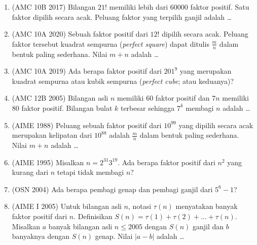 \documentclass[12pt]{scrartcl}
\begin{document}
\begin{enumerate}
	\item (AMC 10B 2017)
	Bilangan $21!$ memiliki lebih dari $60000$ faktor positif.
	Satu faktor dipilih secara acak.
	Peluang faktor yang terpilih ganjil adalah \dots

	\item (AMC 10A 2020)
	Sebuah faktor positif dari $12!$ dipilih secara acak.
	Peluang faktor tersebut kuadrat sempurna (\textit{perfect square}) dapat ditulis $\frac{m}{n}$
	dalam bentuk paling sederhana. Nilai $m + n$ adalah \dots

	\item (AMC 10A 2019)
	Ada berapa faktor positif dari $201^{9}$ yang merupakan kuadrat sempurna
	atau kubik sempurna (\textit{perfect cube}; atau keduanya)?

	\item (AMC 12B 2005)
	Bilangan asli $n$ memiliki $60$ faktor positif dan $7n$ memiliki
	$80$ faktor positif. Bilangan bulat $k$ terbesar sehingga $7^{k}$
	membagi $n$ adalah \dots

	\item (AIME 1988)
	Peluang sebuah faktor positif dari $10^{99}$ yang dipilih secara acak
	merupakan kelipatan dari $10^{88}$ adalah $\frac{m}{n}$ dalam bentuk
	paling sederhana. Nilai $m + n$ adalah \dots

	\item (AIME 1995)
	Misalkan $n = 2^{31}3^{19}$. Ada berapa faktor positif dari $n^2$
	yang kurang dari $n$ tetapi tidak membagi $n$?

	\item (OSN 2004)
	Ada berapa pembagi genap dan pembagi ganjil dari $5^{6} - 1$?

	\item (AIME I 2005)
	Untuk bilangan asli $n$, notasi $\tau(n)$ menyatakan banyak faktor positif
	dari $n$. Definisikan $S(n) = \tau(1) + \tau(2) + \dots + \tau(n)$.
	Misalkan $a$ banyak bilangan asli $n \le 2005$ dengan $S(n)$ ganjil
	dan $b$ banyaknya dengan $S(n)$ genap. Nilai $|a - b|$ adalah \dots


\end{enumerate}
\end{document}
